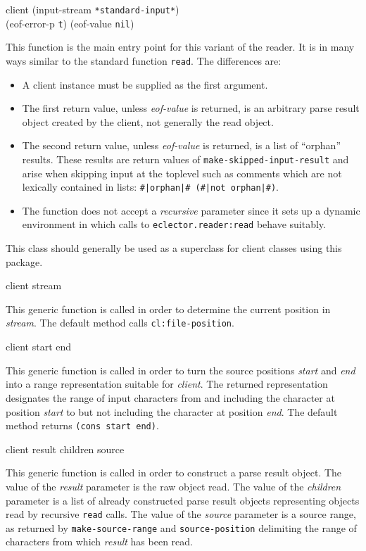  {client \optional (input-stream \texttt{*standard-input*})\\
  (eof-error-p \texttt{t})
  (eof-value \texttt{nil})}

This function is the main entry point for this variant of the reader.
It is in many ways similar to the standard \commonlisp{} function
\texttt{read}.  The differences are:

\begin{itemize}
\item A client instance must be supplied as the first argument.
\item The first return value, unless \textit{eof-value} is returned,
  is an arbitrary parse result object created by the client, not
  generally the read object.
\item The second return value, unless \textit{eof-value} is returned,
  is a list of ``orphan'' results.  These results are return values of
  \texttt{make-skipped-input-result} and arise when skipping input at
  the toplevel such as comments which are not lexically contained in
  lists: \texttt{\#|orphan|\# (\#|not orphan|\#)}.
\item The function does not accept a \textit{recursive} parameter
  since it sets up a dynamic environment in which calls to
  \texttt{eclector.reader:read} behave suitably.
\end{itemize}


This class should generally be used as a superclass for client classes
using this package.

 {client stream}

This generic function is called in order to determine the current
position in \textit{stream}.  The default method calls
\texttt{cl:file-position}.

 {client start end}

This generic function is called in order to turn the source positions
\textit{start} and \textit{end} into a range representation suitable
for \textit{client}.  The returned representation designates the range
of input characters from and including the character at position
\textit{start} to but not including the character at position
\textit{end}.  The default method returns \texttt{(cons start end)}.

 {client result children source}

This generic function is called in order to construct a parse result
object.  The value of the \textit{result} parameter is the raw object
read.  The value of the \textit{children} parameter is a list of
already constructed parse result objects representing objects read by
recursive \texttt{read} calls.  The value of the \textit{source}
parameter is a source range, as returned by \texttt{make-source-range}
and \texttt{source-position} delimiting the range of characters from
which \textit{result} has been read.


